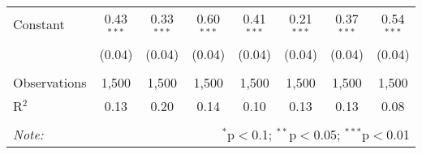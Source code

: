 \documentclass[
]{article}
\begin{document}
\begin{sidewaystable}[!htbp]
\begin{tabular}{@{\extracolsep{1pt}}lccccccc}
  Constant & 0.43$^{***}$ & 0.33$^{***}$ & 0.60$^{***}$ & 0.41$^{***}$ & 0.21$^{***}$ & 0.37$^{***}$ & 0.54$^{***}$ \\ 
  & (0.04) & (0.04) & (0.04) & (0.04) & (0.04) & (0.04) & (0.04) \\ 
 \hline \\[-1.8ex] 
Observations & 1,500 & 1,500 & 1,500 & 1,500 & 1,500 & 1,500 & 1,500 \\ 
R$^{2}$ & 0.13 & 0.20 & 0.14 & 0.10 & 0.13 & 0.13 & 0.08 \\ 
\hline 
\hline \\[-1.8ex] 
\textit{Note:}  & \multicolumn{7}{r}{$^{*}$p$<$0.1; $^{**}$p$<$0.05; $^{***}$p$<$0.01} \\ 
\end{tabular} 
\end{sidewaystable}
\end{document}
